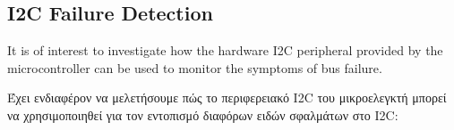 \documentclass[a4paper,nobib]{tufte-book}
\begin{document}


\subsection{\ac{I2C} Failure Detection}
\label{sec:howcani2cfail}

It is of interest to investigate how the hardware \ac{I2C} peripheral provided by the microcontroller can be used to monitor the symptoms of bus failure.

Έχει ενδιαφέρον να μελετήσουμε πώς το περιφερειακό \ac{I2C} του μικροελεγκτή μπορεί να χρησιμοποιηθεί για τον εντοπισμό διαφόρων ειδών σφαλμάτων στο \ac{I2C}:
\end{document}
